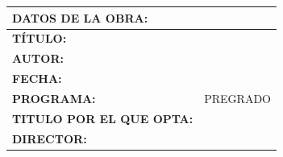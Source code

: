 \begin{tabular}[h] {|| p{5cm}| p{9cm} ||}



\hline
\multicolumn{2}{|l|}{\textbf{DATOS DE LA OBRA: }}\\ 
\hline \hline	
\textbf{TÍTULO:} &	\textbf{\inserttitle} \\ \hline
\textbf{AUTOR:} &	\insertauthor \\ \hline
\textbf{FECHA:} &	 \\ \hline
\textbf{PROGRAMA:} &	PREGRADO \\ \hline 
\textbf{TITULO POR EL QUE OPTA:} &	\insertdegree \\ \hline
\textbf{DIRECTOR:} &	\insertsupervisor \\ \hline



\end{tabular}



